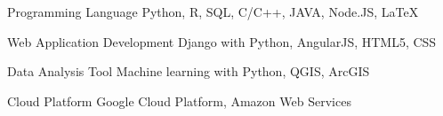 


\begin{cvskills}


\cvskill
{Programming Language} %
{Python, R, SQL, C/C++, JAVA, Node.JS, LaTeX} %


\cvskill
{Web Application Development} %
{Django with Python, AngularJS, HTML5, CSS} %


\cvskill
{Data Analysis Tool} %
{Machine learning with Python, QGIS, ArcGIS} %

\cvskill
{Cloud Platform}
{Google Cloud Platform, Amazon Web Services}

\end{cvskills}